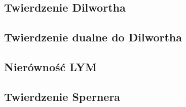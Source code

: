 \subsection{Twierdzenie Dilwortha}


\subsection{Twierdzenie dualne do Dilwortha}


\subsection{Nierówność LYM}


\subsection{Twierdzenie Spernera}
